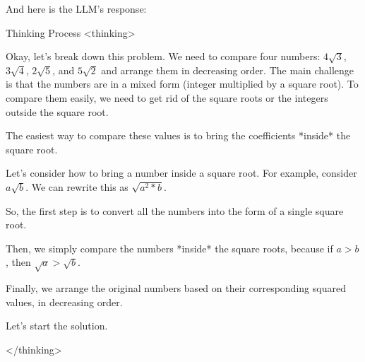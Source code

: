 \documentclass[
    a4paper, %
    10pt, %
    twoside, %
]{LTJournalArticle}
\begin{document}
And here is the LLM's response:

\begin{studentbox}{Thinking Process}
    <thinking>

    Okay, let's break down this problem. We need to compare four numbers:  $4\sqrt{3}$, $3\sqrt{4}$, $2\sqrt{5}$, and $5\sqrt{2}$ and arrange them in decreasing order. The main challenge is that the numbers are in a mixed form (integer multiplied by a square root). To compare them easily, we need to get rid of the square roots or the integers outside the square root.

    \vspace{1em}

    The easiest way to compare these values is to bring the coefficients *inside* the square root.

    \vspace{1em}

    Let's consider how to bring a number inside a square root. For example, consider $a\sqrt{b}$. We can rewrite this as $\sqrt{a^2 * b}$.

    \vspace{1em}

    So, the first step is to convert all the numbers into the form of a single square root.

    \vspace{1em}

    Then, we simply compare the numbers *inside* the square roots, because if $a > b$, then $\sqrt{a} > \sqrt{b}$.

    \vspace{1em}

    Finally, we arrange the original numbers based on their corresponding squared values, in decreasing order.

    \vspace{1em}

    Let's start the solution.

    </thinking>

    \vspace{1em}
\end{studentbox}
\end{document}
